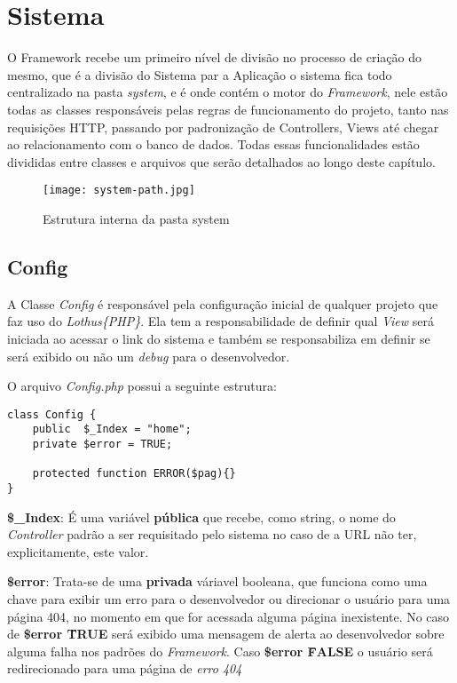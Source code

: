     \section{Sistema\label{sec:system-core}}

        O Framework recebe um primeiro nível de divisão no processo de criação do mesmo, que é a divisão do Sistema par a Aplicação o sistema fica todo centralizado na pasta \emph{system}, e é onde contém o motor do \emph{Framework}, nele estão todas as classes responsáveis pelas regras de funcionamento do projeto, tanto nas requisições HTTP, passando por padronização de Controllers, Views até chegar ao relacionamento com o banco de dados. Todas essas funcionalidades estão divididas entre classes e arquivos que serão detalhados ao longo deste capítulo.

    \begin{figure}[!htb]
        \centering
        \texttt{[image: system-path.jpg]}
        \caption{\small Estrutura interna da pasta system}
        \label{cap:sass}
    \end{figure}



        \subsection{Config\label{sub:system-config}}

            A Classe \emph{Config} é responsável pela configuração inicial de qualquer projeto que faz uso do \emph{Lothus\{PHP\}}. Ela tem a responsabilidade de definir qual \emph{View} será iniciada ao acessar o link do sistema e também se responsabiliza em definir se será exibido ou não um \emph{debug} para o desenvolvedor.

            O arquivo \emph{Config.php} possui a seguinte estrutura:

            \emph{}

\begin{lstlisting}
class Config {
    public  $_Index = "home";
    private $error = TRUE;

    protected function ERROR($pag){}
}
\end{lstlisting}

        \textbf{\$\_Index}: É uma variável \textbf{pública} que recebe, como string, o nome do \emph{Controller} padrão a ser requisitado pelo sistema no caso de a URL não ter, explicitamente, este valor.

        \textbf{\$error}: Trata-se de uma \textbf{privada} váriavel booleana, que funciona como uma chave para exibir um erro para o desenvolvedor ou direcionar o usuário para uma página 404, no momento em que for acessada alguma página inexistente. No caso de \textbf{\$error \= TRUE} será exibido uma mensagem de alerta ao desenvolvedor sobre alguma falha nos padrões do \emph{Framework}. Caso \textbf{\$error \= FALSE} o usuário será redirecionado para uma página de \emph{erro 404}


